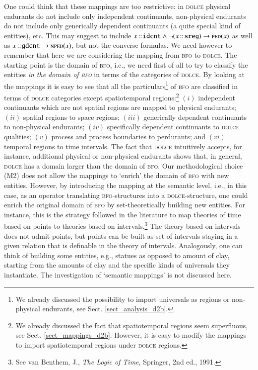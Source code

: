 \documentclass[ao]{iosart2x}
\newcommand{\cn}[1]{\mathtt{#1}}
\newcommand{\dolce}{{\textsc{dolce}}}
\newcommand{\bfo}{{\textsc{bfo}}}
\newcommand {\NPEDdcat} {\textsc{nped}}
\newcommand {\PEDdcat} {\textsc{ped}}
\newcommand{\idcntbcat}{\cn{idcnt}}
\newcommand{\gdcntbcat}{\cn{gdcnt}}
\newcommand{\sregbcat}{\cn{sreg}}
\newcommand{\bfoiof}[1]{{\,::_{#1\:\!}}}
\begin{document}
One could think that these mappings are too restrictive: in {\dolce} physical endurants do not include only independent continuants, non-physical endurants do not include only generically dependent continuants (a quite special kind of entities), etc. This may suggest to include  $x \bfoiof{} \idcntbcat \land \neg(x \bfoiof{} \sregbcat) \to \PEDdcat(x)$ as well as $x \bfoiof{} \gdcntbcat \to \NPEDdcat(x)$, but not the converse formulas. We need however to remember that here we are considering the mapping from {\bfo} to {\dolce}. The starting point is the domain of {\bfo}, i.e., we need first of all to try to classify the entities \emph{in the domain of {\bfo}} in terms of the categories of {\dolce}. By looking at the mappings it is easy to see that all the particulars\footnote{We already discussed the possibility to import universals as regions or non-physical endurants, see Sect. \ref{sect_analysis_d2b}.} of {\bfo} are classified in terms of {\dolce} categories except spatiotemporal regions:\footnote{We already discussed the fact that spatiotemporal regions seem superfluous, see Sect. \ref{sect_mappings_d2b}. However, it is easy to modify the mappings to import spatiotemporal regions under {\dolce} regions.} $(i)$ independent continuants which are not spatial regions are mapped to physical endurants; $(ii)$ spatial regions to space regions; $(iii)$ generically dependent continuants to non-physical endurants; $(iv)$ specifically dependent continuants to {\dolce} qualities; $(v)$ process and process boundaries to perdurants; and $(vi)$ temporal regions to time intervals. The fact that {\dolce} intuitively accepts, for instance, additional physical or non-physical endurants shows that, in general, {\dolce} has a domain larger than the domain of {\bfo}. Our methodological choice (M2) does not allow the mappings to `enrich' the domain of {\bfo} with new entities.  However, by introducing the mapping at the semantic level, i.e., in this case, as an operator translating {\bfo}-structures into a {\dolce}-structure, one could enrich the original domain of {\bfo} by set-theoretically building new entities. For instance, this is the strategy followed in the literature to map theories of time based on points to theories based on intervals.\footnote{See van Benthem, J., \emph{The Logic of Time}, Springer, 2nd ed., 1991.} The theory based on intervals does not admit points, but points can be built as set of intervals staying in a given relation that is definable in the theory of intervals.  Analogously, one can think of building some entities, e.g., statues as opposed to amount of clay, starting from the amounts of clay and the specific kinds of universals they instantiate. The investigation of `semantic mappings' is not discussed here. 
\end{document}
